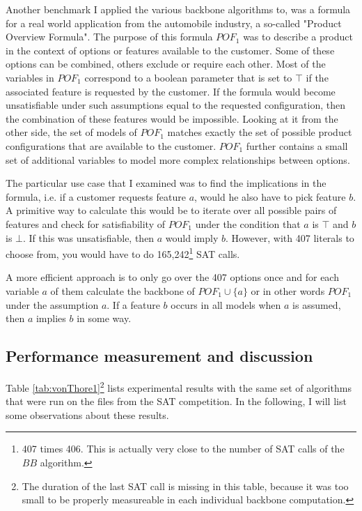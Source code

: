 Another benchmark I applied the various backbone algorithms to, was a formula for a real world application from the automobile industry, a so-called "Product Overview Formula". The purpose of this formula $POF_1$ was to describe a product in the context of options or features available to the customer. Some of these options can be combined, others exclude or require each other. Most of the variables in $POF_1$ correspond to a boolean parameter that is set to $\top$ if the associated feature is requested by the customer. If the formula would become unsatisfiable under such assumptions equal to the requested configuration, then the combination of these features would be impossible. Looking at it from the other side, the set of models of $POF_1$ matches exactly the set of possible product configurations that are available to the customer. $POF_1$ further contains a small set of additional variables to model more complex relationships between options.

The particular use case that I examined was to find the implications in the formula, i.e. if a customer requests feature $a$, would he also have to pick feature $b$. A primitive way to calculate this would be to iterate over all possible pairs of features 
and check for satisfiability of $POF_1$ under the condition that $a$ is $\top$ and $b$ is $\bot$. If this was unsatisfiable, then $a$ would imply $b$. However, with 407 literals to choose from, you would have to do 165,242\footnote{407 times 406. This is actually very close to the number of SAT calls of the $BB$ algorithm.} SAT calls. 

A more efficient approach is to only go over the 407 options once and for each variable $a$ of them calculate the backbone of $POF_1 \cup \{a\}$ or in other words $POF_1$ under the assumption $a$. If a feature $b$ occurs in all models when $a$ is assumed, then $a$ implies $b$ in some way.


\subsection{Performance measurement and discussion}
Table \ref{tab:vonThore1}\footnote{The duration of the last SAT call is missing in this table, because it was too small to be properly measureable in each individual backbone computation.} lists experimental results with the same set of algorithms that were run on the files from the SAT competition. In the following, I will list some observations about these results.

